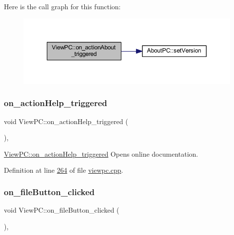 Here is the call graph for this function\+:
\nopagebreak
\begin{figure}[H]
\begin{center}
\leavevmode
\includegraphics[width=349pt]{class_view_p_c_a09a46da4d492eb3dde88f35dc58c997b_cgraph}
\end{center}
\end{figure}
\mbox{\label{class_view_p_c_a0d252ff4829260c6c76769fbd24b7cd7}} 
\subsubsection{\texorpdfstring{on\+\_\+action\+Help\+\_\+triggered}{on\_actionHelp\_triggered}}
{\footnotesize\ttfamily void View\+P\+C\+::on\+\_\+action\+Help\+\_\+triggered (\begin{DoxyParamCaption}{ }\end{DoxyParamCaption})\hspace{0.3cm}{\ttfamily [protected]}, {\ttfamily [slot]}}



\mbox{\hyperlink{class_view_p_c_a0d252ff4829260c6c76769fbd24b7cd7}{View\+P\+C\+::on\+\_\+action\+Help\+\_\+triggered}} Opens online documentation. 



Definition at line \mbox{\hyperlink{viewpc_8cpp_source_l00264}{264}} of file \mbox{\hyperlink{viewpc_8cpp_source}{viewpc.\+cpp}}.

\mbox{\label{class_view_p_c_a3b9b7a7be9702d8b160f257f1c74a776}} 
\subsubsection{\texorpdfstring{on\+\_\+file\+Button\+\_\+clicked}{on\_fileButton\_clicked}}
{\footnotesize\ttfamily void View\+P\+C\+::on\+\_\+file\+Button\+\_\+clicked (\begin{DoxyParamCaption}{ }\end{DoxyParamCaption})\hspace{0.3cm}{\ttfamily [protected]}, {\ttfamily [slot]}}



